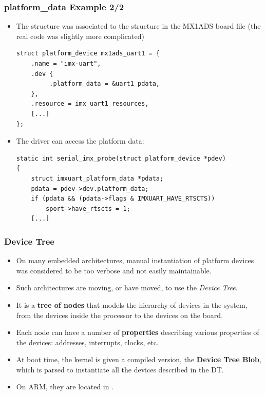 \begin{frame}[fragile]
  \frametitle{platform\_data Example 2/2}
  \begin{itemize}
  \item The  structure was associated to the
     structure in the MX1ADS board file (the
    real code was slightly more complicated)
    \begin{block}{}
  \begin{verbatim}
struct platform_device mx1ads_uart1 = {
    .name = "imx-uart",
    .dev {
         .platform_data = &uart1_pdata,
    },
    .resource = imx_uart1_resources,
    [...]
};
  \end{verbatim}
  \end{block}
  \item The driver can access the platform data:
    \begin{block}{}
  \begin{verbatim}
static int serial_imx_probe(struct platform_device *pdev)
{
    struct imxuart_platform_data *pdata;
    pdata = pdev->dev.platform_data;
    if (pdata && (pdata->flags & IMXUART_HAVE_RTSCTS))
        sport->have_rtscts = 1;
    [...]
  \end{verbatim}
  \end{block}
\end{itemize}
\end{frame}

\begin{frame}
  \frametitle{Device Tree}
  \begin{itemize}
  \item On many embedded architectures, manual instantiation of
    platform devices was considered to be too verbose and not easily
    maintainable.
  \item Such architectures are moving, or have moved, to use the {\em
      Device Tree}.
  \item It is a {\bf tree of nodes} that models the hierarchy of
    devices in the system, from the devices inside the processor to
    the devices on the board.
  \item Each node can have a number of {\bf properties} describing
    various properties of the devices: addresses, interrupts, clocks,
    etc.
  \item At boot time, the kernel is given a compiled version, the {\bf
      Device Tree Blob}, which is parsed to instantiate all the
    devices described in the DT.
  \item On ARM, they are located in .
  \end{itemize}
\end{frame}

